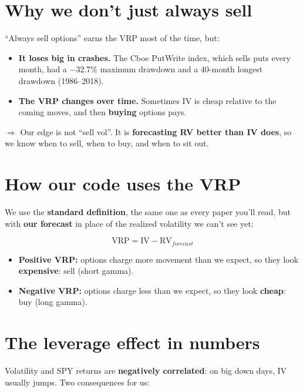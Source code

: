 \documentclass{article}
\begin{document}
\section{Why we don't just always sell}

``Always sell options'' earns the VRP most of the time, but:

\begin{itemize}

\item \textbf{It loses big in crashes.} The Cboe PutWrite index, which sells puts every month, had a \ensuremath{-}32.7\% maximum drawdown and a 40-month longest drawdown (1986--2018).

\item \textbf{The VRP changes over time.} Sometimes IV is cheap relative to the coming moves, and then \textbf{buying} options pays.

\end{itemize}

\textbf{$\Rightarrow$} Our edge is not ``sell vol''. It is \textbf{forecasting RV better than IV does}, so we know when to sell, when to buy, and when to sit out.

\section{How our code uses the VRP}

We use the \textbf{standard definition}, the same one as every paper you'll read, but with \textbf{our forecast} in place of the realized volatility we can't see yet:

\[\text{VRP} = \text{IV} - \text{RV}_{forecast}\]

\begin{itemize}

\item \textbf{Positive VRP:} options charge more movement than we expect, so they look \textbf{expensive}: sell (short gamma).

\item \textbf{Negative VRP:} options charge less than we expect, so they look \textbf{cheap}: buy (long gamma).

\end{itemize}

\section{The leverage effect in numbers}

Volatility and SPY returns are \textbf{negatively correlated}: on big down days, IV usually jumps. Two consequences for us:
\end{document}
